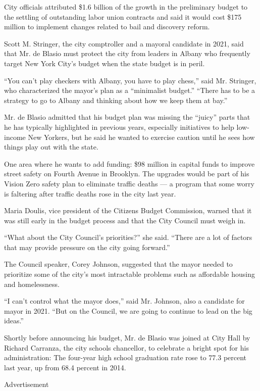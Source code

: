 City officials attributed \$1.6 billion of the growth in the preliminary
budget to the settling of outstanding labor union contracts and said it
would cost \$175 million to implement changes related to bail and
discovery reform.

Scott M. Stringer, the city comptroller and a mayoral candidate in 2021,
said that Mr. de Blasio must protect the city from leaders in Albany who
frequently target New York City's budget when the state budget is in
peril.

``You can't play checkers with Albany, you have to play chess,'' said
Mr. Stringer, who characterized the mayor's plan as a ``minimalist
budget.'' ``There has to be a strategy to go to Albany and thinking
about how we keep them at bay.''

Mr. de Blasio admitted that his budget plan was missing the ``juicy''
parts that he has typically highlighted in previous years, especially
initiatives to help low-income New Yorkers, but he said he wanted to
exercise caution until he sees how things play out with the state.

One area where he wants to add funding: \$98 million in capital funds to
improve street safety on Fourth Avenue in Brooklyn. The upgrades would
be part of his Vision Zero safety plan to eliminate traffic deaths --- a
program that some worry is faltering after traffic deaths rose in the
city last year.

Maria Doulis, vice president of the Citizens Budget Commission, warned
that it was still early in the budget process and that the City Council
must weigh in.

``What about the City Council's priorities?'' she said. ``There are a
lot of factors that may provide pressure on the city going forward.''

The Council speaker, Corey Johnson, suggested that the mayor needed to
prioritize some of the city's most intractable problems such as
affordable housing and homelessness.

``I can't control what the mayor does,'' said Mr. Johnson, also a
candidate for mayor in 2021. ``But on the Council, we are going to
continue to lead on the big ideas.''

Shortly before announcing his budget, Mr. de Blasio was joined at City
Hall by Richard Carranza, the city schools chancellor, to celebrate a
bright spot for his administration: The four-year high school graduation
rate rose to 77.3 percent last year, up from 68.4 percent in 2014.

Advertisement


